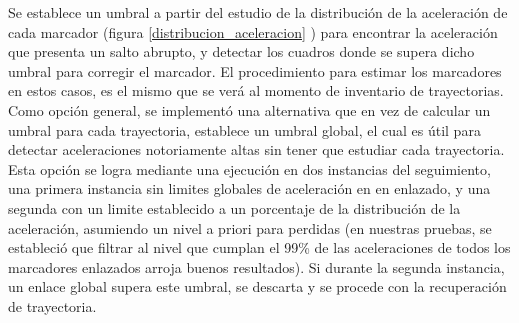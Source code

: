 \begin{itemize}
Se establece un umbral a partir del estudio de la distribución de la aceleración de cada marcador (figura \ref{distribucion_aceleracion} ) para encontrar la aceleración que presenta un salto abrupto, y detectar los cuadros donde se supera dicho umbral para corregir el marcador. El procedimiento para estimar los marcadores en estos casos, es el mismo que se verá al momento de inventario de trayectorias. 
\\ 

Como opción general, se implementó una alternativa que en vez de calcular un umbral para cada trayectoria, establece un umbral global, el cual es útil para detectar aceleraciones notoriamente altas sin tener que estudiar cada trayectoria. Esta opción se logra mediante una ejecución en dos instancias del seguimiento, una primera instancia sin limites globales de aceleración en en enlazado, y una segunda con un limite establecido a un porcentaje de la distribución de la aceleración, asumiendo un nivel a priori para perdidas (en nuestras pruebas, se estableció que filtrar al nivel que cumplan el 99\% de las aceleraciones de todos los marcadores enlazados arroja buenos resultados). Si durante la segunda instancia, un enlace global supera este umbral, se descarta y se procede con la recuperación de trayectoria.


\end{itemize}
